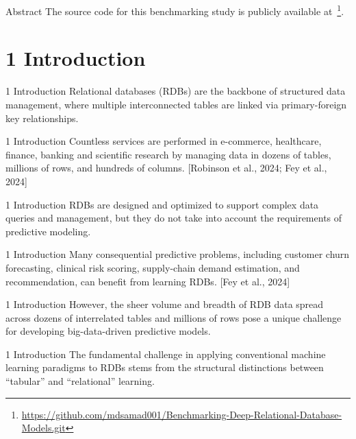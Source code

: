 \documentclass[aspectratio=169,10pt]{beamer}
\newcommand{\cit}[1]{{\scriptsize\color{gray}[#1]}}
\begin{document}
\begin{frame}{Abstract}
The source code for this benchmarking study is publicly available at~\footnote{\href{https://github.com/mdsamad001/Benchmarking-Deep-Relational-Database-Models.git}%
{https://github.com/mdsamad001/Benchmarking-Deep-Relational-Database-Models.git}}.
\end{frame}

\section{1 Introduction}

\begin{frame}{1 Introduction}
Relational databases (RDBs) are the backbone of structured data management, where multiple interconnected tables are linked via primary-foreign key relationships.
\end{frame}

\begin{frame}{1 Introduction}
Countless services are performed in e-commerce, healthcare, finance, banking and scientific research by managing data in dozens of tables, millions of rows, and hundreds of columns.
\cit{Robinson et al., 2024; Fey et al., 2024}
\end{frame}

\begin{frame}{1 Introduction}
RDBs are designed and optimized to support complex data queries and management, but they do not take into account the requirements of predictive modeling.
\end{frame}

\begin{frame}{1 Introduction}
Many consequential predictive problems, including customer churn forecasting, clinical risk scoring, supply-chain demand estimation, and recommendation, can benefit from learning RDBs.
\cit{Fey et al., 2024}
\end{frame}

\begin{frame}{1 Introduction}
However, the sheer volume and breadth of RDB data spread across dozens of interrelated tables and millions of rows pose a unique challenge for developing big-data-driven predictive models.
\end{frame}

\begin{frame}{1 Introduction}
The fundamental challenge in applying conventional machine learning paradigms to RDBs stems from the structural distinctions between ``tabular'' and ``relational'' learning.
\end{frame}
\end{document}
